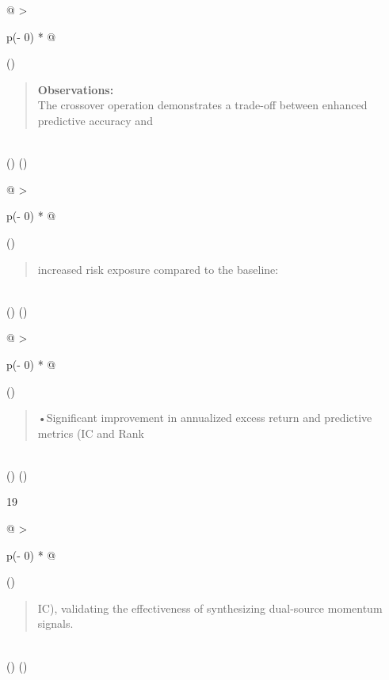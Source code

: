 \documentclass[
]{article}
\begin{document}
\begin{longtable}[]{@{}
  >{\raggedright\arraybackslash}p{(\columnwidth - 0\tabcolsep) * }@{}}
\toprule()
\begin{minipage}[b]{\linewidth}\raggedright
\begin{quote}
\textbf{Observations:}\\
The crossover operation demonstrates a trade-off between enhanced
predictive accuracy and
\end{quote}\strut
\end{minipage} \\
\midrule()
\endhead
\bottomrule()
\end{longtable}

\begin{longtable}[]{@{}
  >{\raggedright\arraybackslash}p{(\columnwidth - 0\tabcolsep) * }@{}}
\toprule()
\begin{minipage}[b]{\linewidth}\raggedright
\begin{quote}
increased risk exposure compared to the baseline:
\end{quote}
\end{minipage} \\
\midrule()
\endhead
\bottomrule()
\end{longtable}

\begin{longtable}[]{@{}
  >{\raggedright\arraybackslash}p{(\columnwidth - 0\tabcolsep) * }@{}}
\toprule()
\begin{minipage}[b]{\linewidth}\raggedright
\begin{quote}
•Significant improvement in annualized excess return and predictive
metrics (IC and Rank
\end{quote}
\end{minipage} \\
\midrule()
\endhead
\bottomrule()
\end{longtable}

19

\begin{longtable}[]{@{}
  >{\raggedright\arraybackslash}p{(\columnwidth - 0\tabcolsep) * }@{}}
\toprule()
\begin{minipage}[b]{\linewidth}\raggedright
\begin{quote}
IC), validating the effectiveness of synthesizing dual-source momentum
signals.
\end{quote}
\end{minipage} \\
\midrule()
\endhead
\bottomrule()
\end{longtable}
\end{document}
